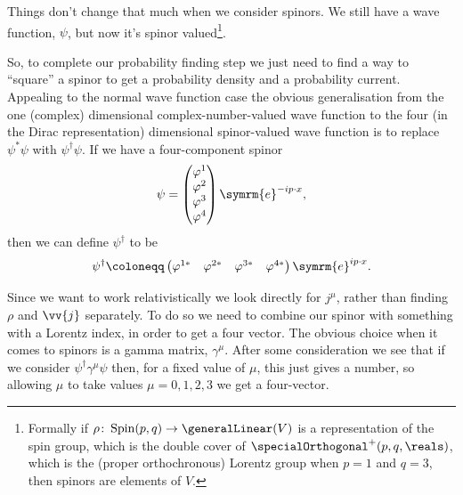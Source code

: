 \documentclass[fleqn]{NotesClass}
\newcommand{\e}{\symrm{e}}
\newcommand{\hermit}{\dagger}
\begin{document}
    Things don't change that much when we consider spinors.
    We still have a wave function, \(\psi\), but now it's spinor valued\footnote{Formally if \(\rho \colon \operatorname{Spin}(p, q) \to \generalLinear(V)\) is a representation of the spin group, which is the double cover of \(\specialOrthogonal^+(p, q, \reals)\), which is the (proper orthochronous) Lorentz group when \(p = 1\) and \(q = 3\), then spinors are elements of \(V\).}.
    
    So, to complete our probability finding step we just need to find a way to \enquote{square} a spinor to get a probability density and a probability current.
    Appealing to the normal wave function case the obvious generalisation from the one (complex) dimensional complex-number-valued wave function to the four (in the Dirac representation) dimensional spinor-valued wave function is to replace \(\psi^*\psi\) with \(\psi^\hermit \psi\).
    If we have a four-component spinor
    \begin{equation}
        \psi = 
        \begin{pmatrix}
            \varphi^1\\ \varphi^2\\ \varphi^3\\ \varphi^4
        \end{pmatrix}
        \e^{-ip\cdot x},
    \end{equation}
    then we can define \(\psi^\hermit\) to be
    \begin{equation}
        \psi^\hermit \coloneqq 
        \begin{pmatrix}
            \varphi^{1*} & \varphi^{2*} & \varphi^{3*} & \varphi^{4*}
        \end{pmatrix}
        \e^{ip\cdot x}.
    \end{equation}
    
    Since we want to work relativistically we look directly for \(j^\mu\), rather than finding \(\rho\) and \(\vv{j}\) separately.
    To do so we need to combine our spinor with something with a Lorentz index, in order to get a four vector.
    The obvious choice when it comes to spinors is a gamma matrix, \(\gamma^\mu\).
    After some consideration we see that if we consider \(\psi^\hermit \gamma^\mu \psi\) then, for a fixed value of \(\mu\), this just gives a number, so allowing \(\mu\) to take values \(\mu = 0, 1, 2, 3\) we get a four-vector.
    
\end{document}
